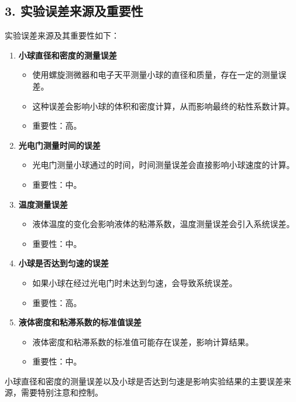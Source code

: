 \documentclass[UTF8]{ctexart}
\begin{document}
\subsection{3. 实验误差来源及重要性}

实验误差来源及其重要性如下：

\begin{enumerate}
    \item \textbf{小球直径和密度的测量误差}
    \begin{itemize}
        \item 使用螺旋测微器和电子天平测量小球的直径和质量，存在一定的测量误差。
        \item 这种误差会影响小球的体积和密度计算，从而影响最终的粘性系数计算。
        \item 重要性：高。
    \end{itemize}

    \item \textbf{光电门测量时间的误差}
    \begin{itemize}
        \item 光电门测量小球通过的时间，时间测量误差会直接影响小球速度的计算。
        \item 重要性：中。
    \end{itemize}

    \item \textbf{温度测量误差}
    \begin{itemize}
        \item 液体温度的变化会影响液体的粘滞系数，温度测量误差会引入系统误差。
        \item 重要性：中。
    \end{itemize}

    \item \textbf{小球是否达到匀速的误差}
    \begin{itemize}
        \item 如果小球在经过光电门时未达到匀速，会导致系统误差。
        \item 重要性：高。
    \end{itemize}

    \item \textbf{液体密度和粘滞系数的标准值误差}
    \begin{itemize}
        \item 液体密度和粘滞系数的标准值可能存在误差，影响计算结果。
        \item 重要性：中。
    \end{itemize}
\end{enumerate}

小球直径和密度的测量误差以及小球是否达到匀速是影响实验结果的主要误差来源，需要特别注意和控制。
\end{document}
